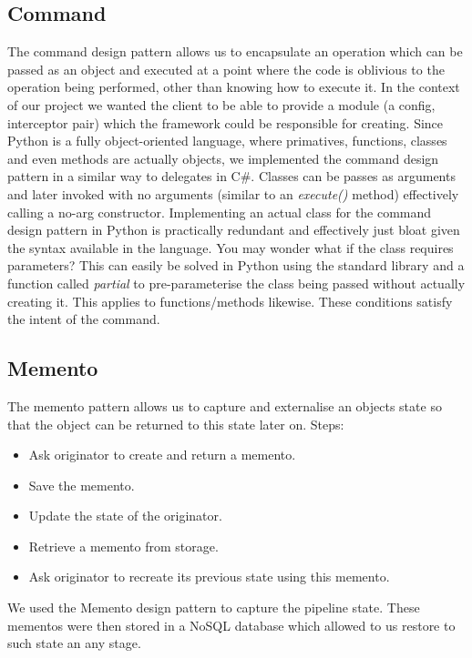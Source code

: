 \subsection{Command}
The command design pattern allows us to encapsulate an operation which can be passed as an object and executed at
a point where the code is oblivious to the operation being performed, other than knowing how to execute it.
In the context of our project we wanted the client to be able to provide a module (a config, interceptor pair)
which the framework could be responsible for creating. Since Python is a fully object-oriented language, where
primatives, functions, classes and even methods are actually objects, we implemented the command design pattern
in a similar way to delegates in C\#. Classes can be passes as arguments and later invoked with no arguments
(similar to an \emph{execute()} method) effectively calling a no-arg constructor. Implementing an actual class
for the command design pattern in Python is practically redundant and effectively just bloat given the syntax
available in the language. You may wonder what if the class requires parameters? This can easily be solved in
Python using the standard library and a function called \emph{partial} to pre-parameterise the class being passed
without actually creating it. This applies to functions/methods likewise. These conditions satisfy the intent of
the command.

\subsection{Memento}
The memento pattern allows us to capture and externalise an objects state so that the object can be returned to
this state later on.
Steps:
\begin{itemize}
	\item Ask originator to create and return a memento.
	\item Save the memento.
	\item Update the state of the originator.
	\item Retrieve a memento from storage.
	\item Ask originator to recreate its previous state using this memento.
\end{itemize}

We used the Memento design pattern to capture the pipeline state. These mementos were then stored in
a NoSQL database which allowed to us restore to such state an any stage.

